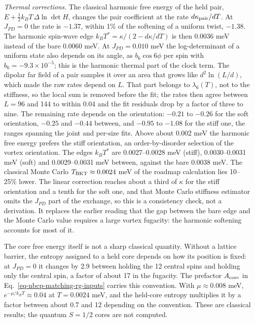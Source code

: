 \emph{Thermal corrections.} The classical harmonic free energy of the
held pair, \(E+\tfrac12k_BT\,\Delta\ln\det H\), changes the pair
coefficient at the rate \(d\kappa_{\rm pair}/dT\). At \(J_{PD}=0\) the
rate is \(-1.37\), within 1\% of the softening of a uniform twist,
\(-1.38\). The harmonic spin-wave edge
\(k_BT^*=\kappa/(2-d\kappa/dT)\) is then 0.0036 meV instead of the
bare 0.0060 meV. At \(J_{PD}=0.010\) meV the log-determinant of a
uniform state also depends on its angle, as \(b_6\cos6\phi\) per spin
with \(b_6=-9.3\times10^{-5}\); this is the harmonic thermal part of
the clock term. The dipolar far field of a pair samples it over an area
that grows like \(d^2\ln(L/d)\), which made the raw rates depend on
\(L\). That part belongs to \(\lambda_6(T)\), not to the stiffness, so
the local sum is removed before the fit; the rates then agree between
\(L=96\) and 144 to within 0.04 and the fit residuals drop by a factor of
three to nine. The remaining rate depends on the orientation:
\(-0.21\) to \(-0.26\) for the soft orientation, \(-0.25\) and \(-0.44\)
between, and \(-0.95\) to \(-1.08\) for the stiff one, the ranges
spanning the joint and per-size fits. Above about 0.002 meV the
harmonic free energy prefers the stiff orientation, an
order-by-disorder selection of the vortex orientation. The edges
\(k_BT^*\) are 0.0027--0.0028 meV (stiff), 0.0030--0.0031 meV (soft)
and 0.0029--0.0031 meV between, against the bare 0.0038 meV. The
classical Monte Carlo \(T_{\rm BKT}\approx0.0024\) meV of the roadmap
calculation lies 10--25\% lower. The linear correction reaches about a
third of \(\kappa\) for the stiff orientation and a tenth for the soft
one, and that Monte Carlo stiffness estimator omits the \(J_{PD}\) part
of the exchange, so this is a consistency check, not a derivation. It
replaces the earlier reading that the gap between the bare edge and the
Monte Carlo value requires a large vortex fugacity: the harmonic
softening accounts for most of it.

The core free energy itself is not a sharp classical quantity. Without
a lattice barrier, the entropy assigned to a held core depends on how
its position is fixed: at \(J_{PD}=0\) it changes by 2.9 between
holding the 12 central spins and holding only the central spin, a
factor of about 17 in the fugacity. The prefactor \(A_{\rm core}\) in
Eq.~\eqref{eq-nbcp-matching-rg-inputs} carries this convention. With
\(\mu\approx0.008\) meV, \(e^{-\mu/k_BT}\approx0.04\) at
\(T=0.0024\) meV, and the held-core entropy multiplies it by a factor
between about 0.7 and 12 depending on the convention. These are
classical results; the quantum \(S=1/2\) cores are not computed.


